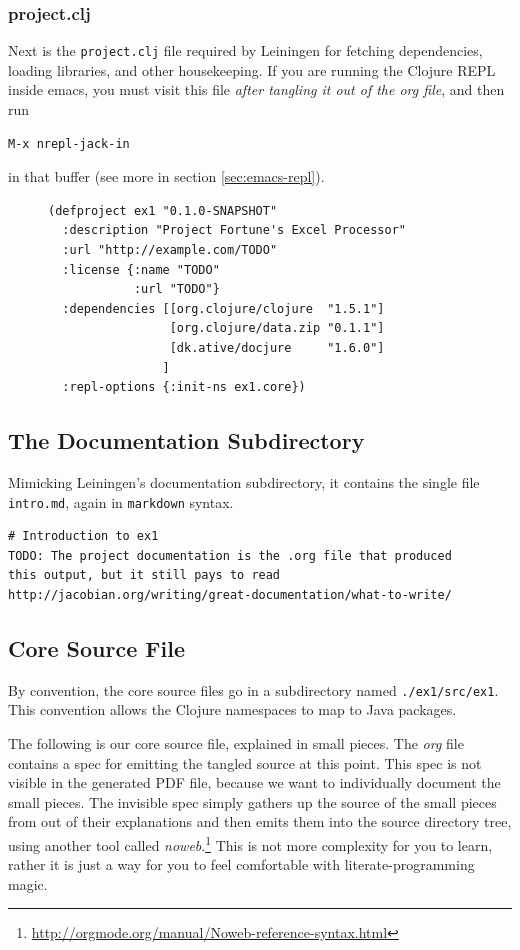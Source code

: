 \documentclass[11pt]{article}
\begin{document}
\subsubsection{project.clj}
\label{sec-2-1-3}
Next is the \verb+project.clj+ file required by Leiningen for fetching
dependencies, loading libraries, and other housekeeping. If you are
running the Clojure REPL inside emacs, you must visit this file \emph{after
tangling it out of the org file}, and then run
\begin{verbatim}
M-x nrepl-jack-in
\end{verbatim}
in that buffer (see more in section
\ref{sec:emacs-repl}). 
\begin{figure}[H]
\label{project-file}
\begin{verbatim}
(defproject ex1 "0.1.0-SNAPSHOT"
  :description "Project Fortune's Excel Processor"
  :url "http://example.com/TODO"
  :license {:name "TODO"
            :url "TODO"}
  :dependencies [[org.clojure/clojure  "1.5.1"]
                 [org.clojure/data.zip "0.1.1"]
                 [dk.ative/docjure     "1.6.0"]
                ]
  :repl-options {:init-ns ex1.core})
\end{verbatim}
\end{figure}
\subsection{The Documentation Subdirectory}
\label{sec-2-2}
Mimicking Leiningen's documentation subdirectory, it contains the
single file \verb+intro.md+, again in \verb+markdown+ syntax.
\begin{verbatim}
# Introduction to ex1
TODO: The project documentation is the .org file that produced 
this output, but it still pays to read
http://jacobian.org/writing/great-documentation/what-to-write/
\end{verbatim}

\subsection{Core Source File}
\label{sec-2-3}
By convention, the core source files go in a subdirectory named
\verb+./ex1/src/ex1+. This convention allows the Clojure namespaces
to map to Java packages.

The following is our core source file, explained in small pieces.
The \emph{org} file contains a spec for emitting the tangled source at
this point. This spec is not visible in the generated PDF file,
because we want to individually document the small pieces. The
invisible spec simply gathers up the source of the small pieces from
out of their explanations and then emits them into the source
directory tree, using another tool called
\emph{noweb}.\footnote{\url{http://orgmode.org/manual/Noweb-reference-syntax.html}}
This is not more complexity for you to learn, rather it is just a
way for you to feel comfortable with literate-programming magic.
\end{document}
